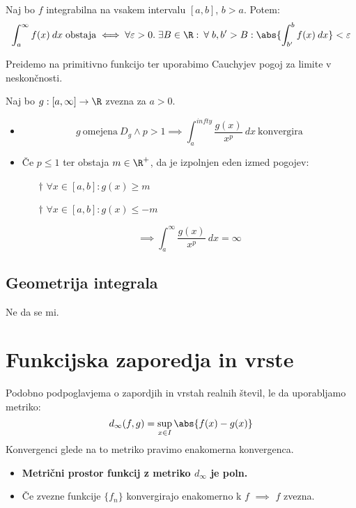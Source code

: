 \documentclass[12pt, a4paper, unicode]{article}
\begin{document}
\begin{izrek}
Naj bo $f$ integrabilna na vsakem intervalu $[a,b]$, $b > a$. Potem:$$\int_{a}^{\infty} f(x) \: dx \;\text{obstaja} \iff \forall \varepsilon > 0. \; \exists B \in \R: \: \forall \; b,b' > B: \abs{\int_{b'}^{b} f(x) \: dx} < \varepsilon$$    
\end{izrek}
\begin{oris}
Preidemo na primitivno funkcijo ter uporabimo Cauchyjev pogoj za limite v neskončnosti.
\end{oris}

\begin{izrek}
Naj bo $g: [a, \infty] \to \R$ zvezna za $a > 0$.
\begin{itemize}
    \item $$g \: \text{omejena} \: D_g \land p > 1 \implies \int_{a}^{infty} \frac{g(x)}{x^p} \: dx \: \text{konvergira}$$
    \item Če $p \leq 1$ ter obstaja $m \in \R^{+}$, da je izpolnjen eden izmed pogojev:
    \begin{itemize}
            \item[$\dagger$] $\forall x \in [a,b]: g(x) \geq m$
            \item[$\dagger$] $\forall x \in [a,b]: g(x) \leq -m$
    \end{itemize}
    $$\implies \int_{a}^{\infty} \frac{g(x)}{x^p} \: dx = \infty$$
\end{itemize}
\end{izrek}

\subsection{Geometrija integrala}
Ne da se mi.

\newpage
\section{Funkcijska zaporedja in vrste}
\begin{definicija}
Podobno podpoglavjema o zapordjih in vrstah realnih števil, le da uporabljamo metriko: $$d_{\infty}(f,g) = \sup_{x \in I} \abs{f(x) - g(x)}$$
Konvergenci glede na to metriko pravimo enakomerna konvergenca.
\end{definicija}

\begin{izrek}
\begin{itemize}
    \item \textbf{Metrični prostor funkcij z metriko $d_\infty$ je poln.}
    \item Če zvezne funkcije $\{f_n\}$ konvergirajo enakomerno k $f$ $\implies$ $f$ zvezna.
\end{itemize}    
\end{izrek}
\end{document}
